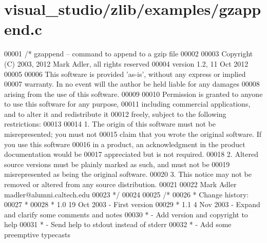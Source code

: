 \hypertarget{visual__studio_2zlib_2examples_2gzappend_8c_source}{}\section{visual\+\_\+studio/zlib/examples/gzappend.c}
\label{visual__studio_2zlib_2examples_2gzappend_8c_source}

\begin{DoxyCode}
00001 \textcolor{comment}{/* gzappend -- command to append to a gzip file}
00002 \textcolor{comment}{}
00003 \textcolor{comment}{  Copyright (C) 2003, 2012 Mark Adler, all rights reserved}
00004 \textcolor{comment}{  version 1.2, 11 Oct 2012}
00005 \textcolor{comment}{}
00006 \textcolor{comment}{  This software is provided 'as-is', without any express or implied}
00007 \textcolor{comment}{  warranty.  In no event will the author be held liable for any damages}
00008 \textcolor{comment}{  arising from the use of this software.}
00009 \textcolor{comment}{}
00010 \textcolor{comment}{  Permission is granted to anyone to use this software for any purpose,}
00011 \textcolor{comment}{  including commercial applications, and to alter it and redistribute it}
00012 \textcolor{comment}{  freely, subject to the following restrictions:}
00013 \textcolor{comment}{}
00014 \textcolor{comment}{  1. The origin of this software must not be misrepresented; you must not}
00015 \textcolor{comment}{     claim that you wrote the original software. If you use this software}
00016 \textcolor{comment}{     in a product, an acknowledgment in the product documentation would be}
00017 \textcolor{comment}{     appreciated but is not required.}
00018 \textcolor{comment}{  2. Altered source versions must be plainly marked as such, and must not be}
00019 \textcolor{comment}{     misrepresented as being the original software.}
00020 \textcolor{comment}{  3. This notice may not be removed or altered from any source distribution.}
00021 \textcolor{comment}{}
00022 \textcolor{comment}{  Mark Adler    madler@alumni.caltech.edu}
00023 \textcolor{comment}{ */}
00024 
00025 \textcolor{comment}{/*}
00026 \textcolor{comment}{ * Change history:}
00027 \textcolor{comment}{ *}
00028 \textcolor{comment}{ * 1.0  19 Oct 2003     - First version}
00029 \textcolor{comment}{ * 1.1   4 Nov 2003     - Expand and clarify some comments and notes}
00030 \textcolor{comment}{ *                      - Add version and copyright to help}
00031 \textcolor{comment}{ *                      - Send help to stdout instead of stderr}
00032 \textcolor{comment}{ *                      - Add some preemptive typecasts}

\end{DoxyCode}
